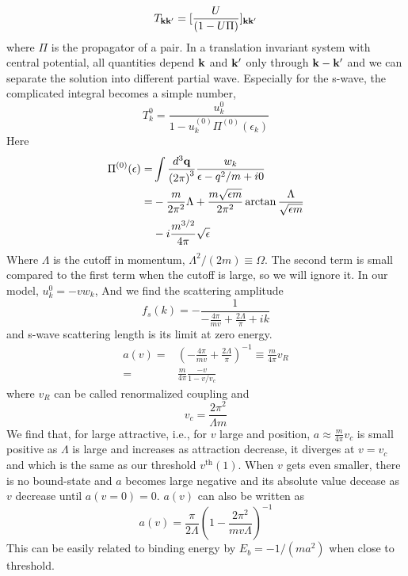 \begin{equation}
T_{\mathbf{k}\mathbf{k}'}=[\frac{U}{(1-U\Pi)}]_{\mathbf{k}\mathbf{k}'}
\end{equation}
where $\Pi$ is the propagator of a pair.  In a translation invariant system with central potential, all quantities depend $\mathbf{k}$ and $\mathbf{k}'$ only through $\mathbf{k}-\mathbf{k}'$ and we can separate the solution into different partial wave. Especially for the s-wave, the complicated  integral becomes a simple number,
\begin{equation}
T^{0}_{k}=\frac{u^{0}_{k}}{1-u^{(0)}_{k}\Pi^{(0)}(\epsilon_k)}
\end{equation}
Here 
\begin{equation}
\begin{split}
\Pi^{(0)}(\epsilon)=&\int\frac{d^{3}\mathbf{q}}{{(2\pi)}^{3}}\frac{w_{k}}{\epsilon-q^{2}/m+i0}\\
=&-\frac{m}{2\pi^{2}}{\Lambda}+\frac{m\sqrt{\epsilon{m}}}{2\pi^{2}}\arctan\frac{\Lambda}{\sqrt{\epsilon{m}}}\\
&-i\frac{m^{3/2}}{4\pi}\sqrt{\epsilon}
\end{split}
\end{equation}
Where $\Lambda$ is the cutoff in momentum, $\Lambda^{2}/(2m)\equiv\Omega$. The second term is small compared to the first term when the cutoff is large, so we will ignore it.  In our model, $u^{0}_{k}=-vw_{k}$, And we find the scattering amplitude 
\begin{equation}
f_{s}(k)=-\frac{1}{-\frac{4\pi}{mv}+\frac{2\Lambda}{\pi}+ik}
\end{equation}
and s-wave scattering length is its limit at zero energy. 
\begin{equation}
\begin{split}
a(v)=&\left(-\frac{4\pi}{mv}+\frac{2\Lambda}{\pi}\right)^{-1}\equiv\frac{m}{4\pi}v_{R}\\
     =&\frac{m}{4\pi}\frac{-v}{1-v/v_{c}}
     \end{split}
\end{equation}
where $v_{R}$ can be called renormalized coupling and 
\begin{equation}
v_{c}=\frac{2\pi^{2}}{\Lambda{m}}
\end{equation}
We find that, for large attractive, i.e., for $v$ large and position, $a\approx\frac{m}{4\pi}v_c$ is small positive as $\Lambda$ is large and increases as attraction decrease, it diverges at $v=v_{c}$ and which is the same as our threshold $v^{\text{th}}(1)$.  When $v$ gets even smaller, there is no bound-state and $a$ becomes large negative and its absolute value decease as $v$ decrease until $a(v=0)=0$. 
$a(v)$ can also be written as
\begin{equation}
a(v)=\frac{\pi}{2\Lambda}\left(1-\frac{2\pi^{2}}{mv\Lambda}\right)^{-1}
\end{equation}
This can be easily related to binding energy by $E_{b}=-1/(ma^{2})$ when close to threshold. 